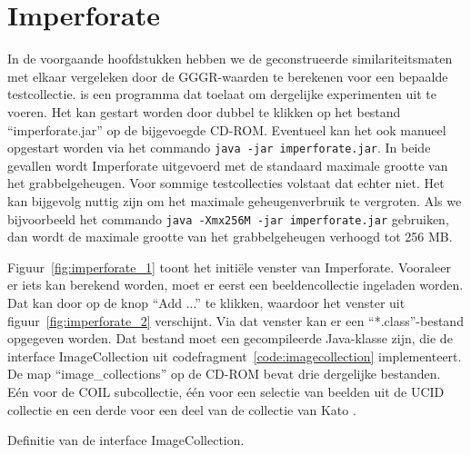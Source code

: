 \section{Imperforate}

In de voorgaande hoofdstukken hebben we de geconstrueerde similariteitsmaten 
met elkaar vergeleken door de GGGR-waarden te berekenen voor een bepaalde testcollectie.
 is een programma dat toelaat om dergelijke experimenten 
uit te voeren. Het kan gestart worden door dubbel te klikken op het 
bestand ``imperforate.jar'' op de bijgevoegde CD-ROM. Eventueel kan het ook
manueel opgestart worden via het commando \texttt{java -jar imperforate.jar}. 
In beide gevallen wordt Imperforate uitgevoerd met de standaard maximale grootte
van het grabbelgeheugen. Voor sommige testcollecties volstaat dat echter niet.
Het kan bijgevolg nuttig zijn om het maximale geheugenverbruik te 
vergroten. Als we bijvoorbeeld het commando 
\texttt{java -Xmx256M -jar imperforate.jar} gebruiken,
dan wordt de maximale grootte van het grabbelgeheugen verhoogd tot 256 MB. 

Figuur~\ref{fig:imperforate_1} toont het initi\"ele venster van Imperforate. Vooraleer er iets
kan berekend worden, moet er eerst een beeldencollectie ingeladen worden.
Dat kan door op de knop ``Add ...'' te klikken, waardoor het venster uit 
figuur~\ref{fig:imperforate_2} verschijnt. Via dat venster kan er een 
``*.class''-bestand opgegeven worden. Dat bestand moet een gecompileerde 
Java-klasse zijn, die de interface {\klassefont ImageCollection} uit 
codefragment~\ref{code:imagecollection} implementeert. De map ``image\_collections''
op de CD-ROM bevat drie dergelijke bestanden. E\'en voor de COIL subcollectie,
\'e\'en voor een selectie van beelden uit de UCID collectie \cite{ucid} en
een derde voor een deel van de collectie van Kato 
\cite{kato:cbir_using_stochastic_paintbrush}.

\begin{code}[!bp]
\vspace{5pt}
\begin{lgrind}

\end{lgrind}
\vspace{5pt}
\caption{\label{code:imagecollection}Definitie van de interface 
{\klassefont ImageCollection}.}
\end{code}

